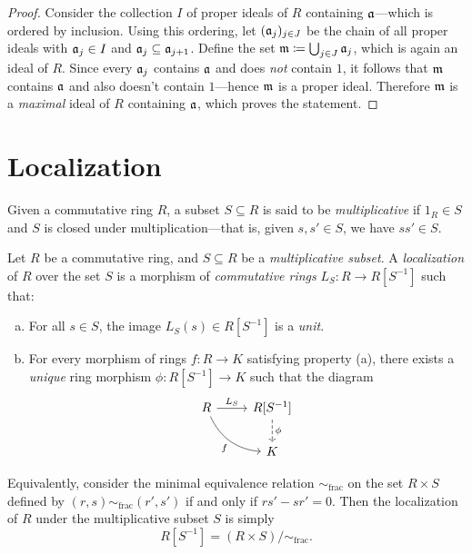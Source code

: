 \begin{proof}
Consider the collection \(I\) of proper ideals of \(R\) containing
\(\mathfrak{a}\)---which is ordered by inclusion. Using this ordering, let
\((\mathfrak{a}_j)_{j \in J}\) be the chain of all proper ideals with
\(\mathfrak{a}_j \in I\) and \(\mathfrak{a}_j \subseteq \mathfrak{a}_{j+1}\). Define the set
\(\mathfrak{m} \coloneq \bigcup_{j \in J} \mathfrak{a}_j\), which is again an ideal of
\(R\). Since every \(\mathfrak{a}_j\) contains \(\mathfrak{a}\) and does \emph{not}
contain \(1\), it follows that \(\mathfrak{m}\) contains \(\mathfrak{a}\) and also
doesn't contain \(1\)---hence \(\mathfrak{m}\) is a proper ideal. Therefore
\(\mathfrak{m}\) is a \emph{maximal} ideal of \(R\) containing \(\mathfrak{a}\), which
proves the statement.
\end{proof}

\section{Localization}

\begin{definition}
\label{def:multiplicative-subset}
Given a commutative ring \(R\), a subset \(S \subseteq R\) is said to be
\emph{multiplicative} if \(1_R \in S\) and \(S\) is closed under
multiplication---that is, given \(s, s' \in S\), we have \(s s' \in S\).
\end{definition}

\begin{definition}[Localization]
\label{def:localization-ring}
Let \(R\) be a commutative ring, and \(S \subseteq R\) be a \emph{multiplicative
  subset}. A \emph{localization} of \(R\) over the set \(S\) is a morphism of
\emph{commutative rings} \(L_S: R \to R[S^{-1}]\) such that:
\begin{enumerate}[(a)]\setlength\itemsep{0em}
\item For all \(s \in S\), the image \(L_S(s) \in R[S^{-1}]\) is a \emph{unit}.
\item For every morphism of rings \(f: R \to K\) satisfying property (a), there
  exists a \emph{unique} ring morphism \(\phi: R[S^{-1}] \to K\) such that the
  diagram
  \[
  \begin{tikzcd}
  R \ar[r, "L_S"] \ar[rd, bend right, "f"']
  &{R[S^{-1}]} \ar[d, "\phi", dashed] \\
  &K
  \end{tikzcd}
  \]
\end{enumerate}
Equivalently, consider the minimal equivalence relation \(\sim_{\text{frac}}\)
on the set \(R \times S\) defined by \((r, s) \sim_{\text{frac}} (r', s')\) if
and only if \(r s' - s r' = 0\). Then the localization of \(R\) under the
multiplicative subset \(S\) is simply
\[
R[S^{-1}] = (R \times S)/{\sim_{\text{frac}}}.
\]
\end{definition}

